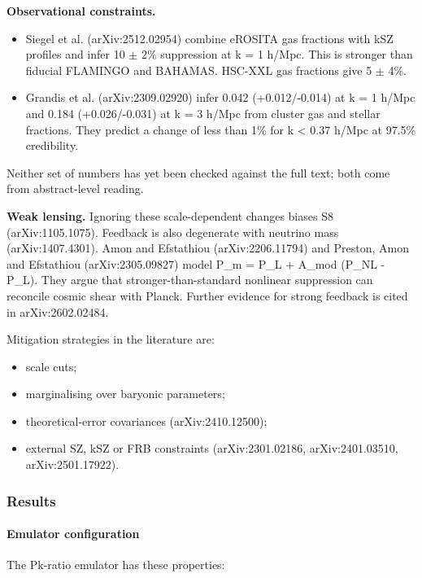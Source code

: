 \documentclass[11pt,a4paper]{article}
\begin{document}
\textbf{Observational constraints.}

\begin{itemize}
  \item Siegel et al. (arXiv:2512.02954) combine eROSITA gas fractions with kSZ profiles and infer 10 $\pm$ 2\% suppression at k = 1 h/Mpc. This is stronger than fiducial FLAMINGO and BAHAMAS. HSC-XXL gas fractions give 5 $\pm$ 4\%.
  \item Grandis et al. (arXiv:2309.02920) infer 0.042 (+0.012/-0.014) at k = 1 h/Mpc and 0.184 (+0.026/-0.031) at k = 3 h/Mpc from cluster gas and stellar fractions. They predict a change of less than 1\% for k \textless{} 0.37 h/Mpc at 97.5\% credibility.
\end{itemize}
Neither set of numbers has yet been checked against the full text; both come from abstract-level reading.

\textbf{Weak lensing.} Ignoring these scale-dependent changes biases S8 (arXiv:1105.1075). Feedback is also degenerate with neutrino mass (arXiv:1407.4301). Amon and Efstathiou (arXiv:2206.11794) and Preston, Amon and Efstathiou (arXiv:2305.09827) model P\_m = P\_L + A\_mod (P\_NL - P\_L). They argue that stronger-than-standard nonlinear suppression can reconcile cosmic shear with Planck. Further evidence for strong feedback is cited in arXiv:2602.02484.

Mitigation strategies in the literature are:

\begin{itemize}
  \item scale cuts;
  \item marginalising over baryonic parameters;
  \item theoretical-error covariances (arXiv:2410.12500);
  \item external SZ, kSZ or FRB constraints (arXiv:2301.02186, arXiv:2401.03510, arXiv:2501.17922).
\end{itemize}
\subsubsection*{Results}
\paragraph{Emulator configuration}
The Pk-ratio emulator has these properties:
\end{document}
